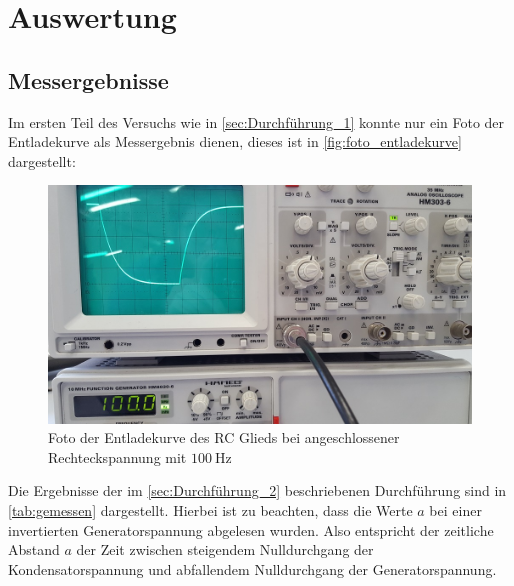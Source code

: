 \section{Auswertung}
\label{sec:Auswertung}

\subsection{Messergebnisse}
\label{sec:Messergebnisse}

Im ersten Teil des Versuchs wie in \autoref{sec:Durchführung_1} konnte nur ein Foto der Entladekurve als Messergebnis dienen, dieses ist in \autoref{fig:foto_entladekurve} dargestellt:

\begin{figure}
    \centering
    \includegraphics[width=\textwidth]{images/foto_01.jpg}
    \caption{Foto der Entladekurve des RC Glieds bei angeschlossener Rechteckspannung mit $\SI{100}{\hertz}$}
    \label{fig:foto_entladekurve}
\end{figure}

Die Ergebnisse der im \autoref{sec:Durchführung_2} beschriebenen Durchführung sind in \autoref{tab:gemessen} dargestellt. Hierbei ist zu beachten, dass die Werte $a$ bei einer invertierten Generatorspannung abgelesen wurden. Also entspricht der zeitliche Abstand $a$ der Zeit zwischen steigendem Nulldurchgang der Kondensatorspannung und abfallendem Nulldurchgang der Generatorspannung.

